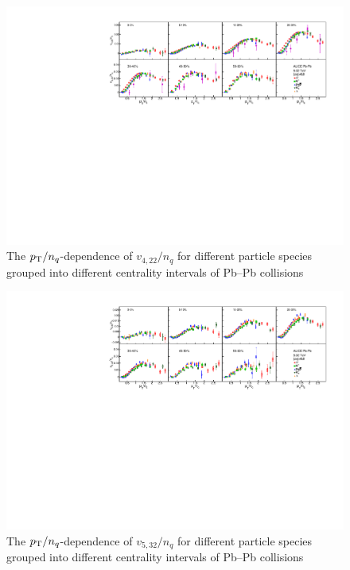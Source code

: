 \begin{figure}[!htb]
\begin{center}
\includegraphics[scale=0.82]{figures/scaling/All_v422_gap00_NCQ.pdf}
\end{center}
\caption{The $p_{\rm{T}}/n_{q}$-dependence of $v_{4,22}/n_{q}$ for different particle species grouped into different centrality intervals of Pb--Pb collisions \sNN}
\label{v422_NCQ}
\end{figure}

\begin{figure}[!htb]
\begin{center}
\includegraphics[scale=0.82]{figures/scaling/All_v523_gap00_NCQ.pdf}
\end{center}
\caption{The $p_{\rm{T}}/n_{q}$-dependence of $v_{5,32}/n_{q}$ for different particle species grouped into different centrality intervals of Pb--Pb collisions \sNN}
\label{v523_NCQ}
\end{figure}

